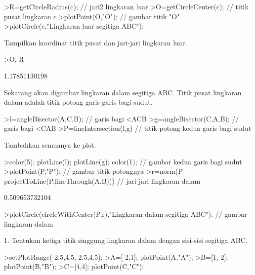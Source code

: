 \documentclass[a4paper,10pt]{article}
\begin{document}
\begin{eulernotebook}
\begin{eulercomment}
\begin{eulercomment}
\begin{eulercomment}
\begin{eulercomment}
\begin{eulercomment}
\begin{eulercomment}
\begin{eulercomment}
\begin{eulercomment}
\begin{eulercomment}
\begin{eulercomment}
\begin{eulercomment}
\begin{eulercomment}
\begin{eulercomment}
\begin{eulercomment}
\begin{eulercomment}
\begin{eulercomment}
\begin{eulerprompt}
>R=getCircleRadius(c); // jari2 lingkaran luar 
>O=getCircleCenter(c); // titik pusat lingkaran c 
>plotPoint(O,"O"); // gambar titik "O"
>plotCircle(c,"Lingkaran luar segitiga ABC"):
\end{eulerprompt}
\begin{eulercomment}
Tampilkan koordinat titik pusat dan jari-jari lingkaran luar.
\end{eulercomment}
\begin{eulerprompt}
>O, R
\end{eulerprompt}
\begin{euleroutput}
  [1.16667,  1.16667]
  1.17851130198
\end{euleroutput}
\begin{eulercomment}
Sekarang akan digambar lingkaran dalam segitiga ABC. Titik pusat lingkaran dalam adalah
titik potong garis-garis bagi sudut.
\end{eulercomment}
\begin{eulerprompt}
>l=angleBisector(A,C,B); // garis bagi <ACB
>g=angleBisector(C,A,B); // garis bagi <CAB
>P=lineIntersection(l,g) // titik potong kedua garis bagi sudut
\end{eulerprompt}
\begin{euleroutput}
  [0.86038,  0.86038]
\end{euleroutput}
\begin{eulercomment}
Tambahkan semuanya ke plot.
\end{eulercomment}
\begin{eulerprompt}
>color(5); plotLine(l); plotLine(g); color(1); // gambar kedua garis bagi sudut
>plotPoint(P,"P"); // gambar titik potongnya
>r=norm(P-projectToLine(P,lineThrough(A,B))) // jari-jari lingkaran dalam
\end{eulerprompt}
\begin{euleroutput}
  0.509653732104
\end{euleroutput}
\begin{eulerprompt}
>plotCircle(circleWithCenter(P,r),"Lingkaran dalam segitiga ABC"): // gambar lingkaran dalam
\end{eulerprompt}
\begin{eulercomment}
1. Tentukan ketiga titik singgung lingkaran dalam dengan sisi-sisi
segitiga ABC.
\end{eulercomment}
\begin{eulerprompt}
>setPlotRange(-2.5,4.5,-2.5,4.5);
>A=[-2,1]; plotPoint(A,"A");
>B=[1,-2]; plotPoint(B,"B");
>C=[4,4]; plotPoint(C,"C"):
\end{eulerprompt}

\end{eulercomment}
\end{eulercomment}
\end{eulercomment}
\end{eulercomment}
\end{eulercomment}
\end{eulercomment}
\end{eulercomment}
\end{eulercomment}
\end{eulercomment}
\end{eulercomment}
\end{eulercomment}
\end{eulercomment}
\end{eulercomment}
\end{eulercomment}
\end{eulercomment}
\end{eulercomment}
\end{eulernotebook}
\end{document}
